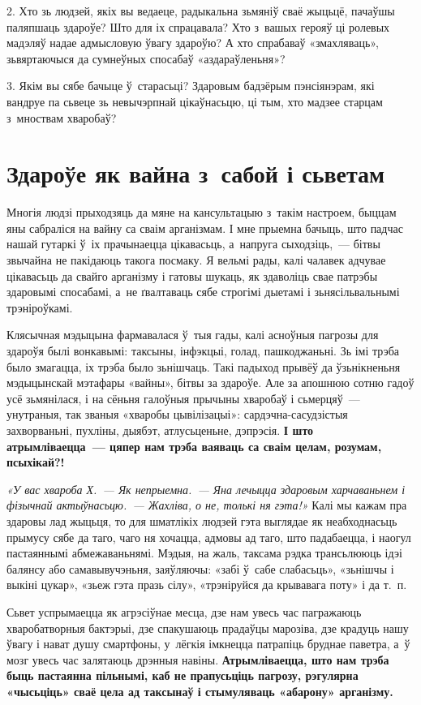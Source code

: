 2. Хто зь людзей, якіх вы ведаеце, радыкальна зьмяніў сваё жыцьцё, пачаўшы паляпшаць здароўе? Што для іх спрацавала? Хто з~вашых герояў ці ролевых мадэляў надае адмысловую ўвагу здароўю? А хто спрабаваў «змахляваць», зьвяртаючыся да сумнеўных спосабаў «аздараўленьня»?

3. Якім вы сябе бачыце ў~старасьці? Здаровым бадзёрым пэнсіянэрам, які вандруе па сьвеце зь невычэрпнай цікаўнасьцю, ці тым, хто мадзее старцам з~мноствам хваробаў?


\section{Здароўе як вайна з~сабой і сьветам}

Многія людзі прыходзяць да мяне на кансультацыю з~такім настроем, быццам яны сабраліся на вайну са сваім арганізмам. І мне прыемна бачыць, што падчас нашай гутаркі ў~іх прачынаецца цікавасьць, а~напруга сыходзіць,~--- бітвы звычайна не пакідаюць такога посмаку. Я вельмі рады, калі чалавек адчувае цікавасьць да свайго арганізму і гатовы шукаць, як здаволіць свае патрэбы здаровымі спосабамі, а~не ґвалтаваць сябе строгімі дыетамі і зьнясільвальнымі трэніроўкамі.

Клясычная мэдыцына фармавалася ў~тыя гады, калі асноўныя пагрозы для здароўя былі вонкавымі: таксыны, інфэкцыі, голад, пашкоджаньні. Зь імі трэба было змагацца, іх трэба было зьнішчаць. Такі падыход прывёў да ўзьнікненьня мэдыцынскай мэтафары «вайны», бітвы за здароўе. Але за апошнюю сотню гадоў усё зьмянілася, і на сёньня галоўныя прычыны хваробаў і сьмерцяў~--- унутраныя, так званыя «хваробы цывілізацыі»: сардэчна-сасудзістыя захворваньні, пухліны, дыябэт, атлусьценьне, дэпрэсія. \textbf{І што атрымліваецца~--- цяпер нам трэба ваяваць са сваім целам, розумам, псыхікай?!}

\emph{«У вас хвароба Х.~--- Як непрыемна.~--- Яна лечыцца здаровым харчаваньнем і фізычнай актыўнасьцю.~--- Жахліва, о не, толькі ня гэта!»} Калі мы кажам пра здаровы лад жыцьця, то для шматлікіх людзей гэта выглядае як неабходнасьць прымусу сябе да таго, чаго ня хочацца, адмовы ад таго, што падабаецца, і наогул пастаяннымі абмежаваньнямі. Мэдыя, на жаль, таксама рэдка трансьлююць ідэі балянсу або самавывучэньня, заяўляючы: «забі ў~сабе слабасьць», «зьнішчы і выкіні цукар», «зьеж гэта празь сілу», «трэніруйся да крывавага поту» і да т.~п.

Сьвет успрымаецца як агрэсіўнае месца, дзе нам увесь час пагражаюць хваробатворныя бактэрыі, дзе спакушаюць прадаўцы марозіва, дзе крадуць нашу ўвагу і нават душу смартфоны, у~лёгкія імкнецца патрапіць бруднае паветра, а~ў мозг увесь час залятаюць дрэнныя навіны. \textbf{Атрымліваецца, што нам трэба быць пастаянна пільнымі, каб не прапусьціць пагрозу, рэгулярна «чысьціць» сваё цела ад таксынаў і стымуляваць «абарону» арганізму.}

